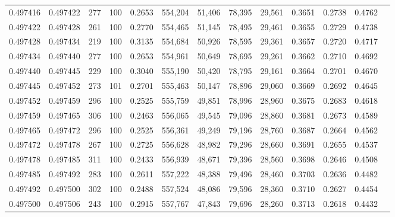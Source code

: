 \begin{tabular}{rrrrrrrrrrrrr}
0.497416 & 0.497422 &   277 & 100 &                                     0.2653 & 554,204 &  51,406 &  78,395 &  29,561 & 0.3651 & 0.2738 & 0.4762 \\
0.497422 & 0.497428 &   261 & 100 &                                     0.2770 & 554,465 &  51,145 &  78,495 &  29,461 & 0.3655 & 0.2729 & 0.4738 \\
0.497428 & 0.497434 &   219 & 100 &                                     0.3135 & 554,684 &  50,926 &  78,595 &  29,361 & 0.3657 & 0.2720 & 0.4717 \\
0.497434 & 0.497440 &   277 & 100 &                                     0.2653 & 554,961 &  50,649 &  78,695 &  29,261 & 0.3662 & 0.2710 & 0.4692 \\
0.497440 & 0.497445 &   229 & 100 &                                     0.3040 & 555,190 &  50,420 &  78,795 &  29,161 & 0.3664 & 0.2701 & 0.4670 \\
0.497445 & 0.497452 &   273 & 101 &                                     0.2701 & 555,463 &  50,147 &  78,896 &  29,060 & 0.3669 & 0.2692 & 0.4645 \\
0.497452 & 0.497459 &   296 & 100 &                                     0.2525 & 555,759 &  49,851 &  78,996 &  28,960 & 0.3675 & 0.2683 & 0.4618 \\
0.497459 & 0.497465 &   306 & 100 &                                     0.2463 & 556,065 &  49,545 &  79,096 &  28,860 & 0.3681 & 0.2673 & 0.4589 \\
0.497465 & 0.497472 &   296 & 100 &                                     0.2525 & 556,361 &  49,249 &  79,196 &  28,760 & 0.3687 & 0.2664 & 0.4562 \\
0.497472 & 0.497478 &   267 & 100 &                                     0.2725 & 556,628 &  48,982 &  79,296 &  28,660 & 0.3691 & 0.2655 & 0.4537 \\
0.497478 & 0.497485 &   311 & 100 &                                     0.2433 & 556,939 &  48,671 &  79,396 &  28,560 & 0.3698 & 0.2646 & 0.4508 \\
0.497485 & 0.497492 &   283 & 100 &                                     0.2611 & 557,222 &  48,388 &  79,496 &  28,460 & 0.3703 & 0.2636 & 0.4482 \\
0.497492 & 0.497500 &   302 & 100 &                                     0.2488 & 557,524 &  48,086 &  79,596 &  28,360 & 0.3710 & 0.2627 & 0.4454 \\
0.497500 & 0.497506 &   243 & 100 &                                     0.2915 & 557,767 &  47,843 &  79,696 &  28,260 & 0.3713 & 0.2618 & 0.4432 \\

\end{tabular}
